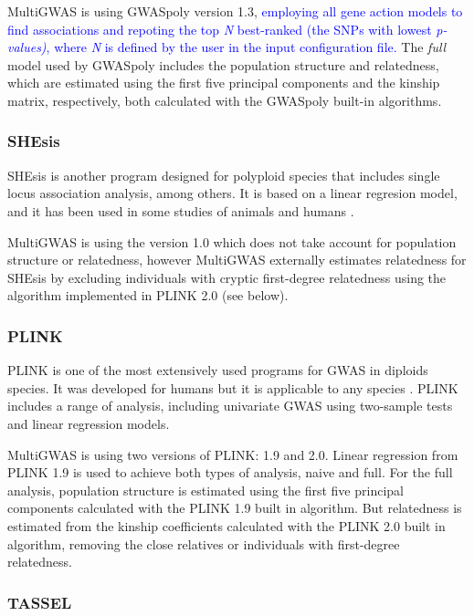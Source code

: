 \documentclass{article}
\begin{document}
MultiGWAS is using GWASpoly version 1.3, \textcolor{blue}{employing all gene action models to find associations and repoting the top }\textcolor{blue}{\emph{N }}\textcolor{blue}{best-ranked (the SNPs with lowest }\textcolor{blue}{\emph{p-values)}}\textcolor{blue}{, where }\textcolor{blue}{\emph{N}}\textcolor{blue}{{} is defined by the user in the input configuration file.} The \emph{full }model used by GWASpoly includes the population structure and relatedness, which are estimated using the first five principal components and the kinship matrix, respectively, both calculated with the GWASpoly built-in algorithms.

\subsubsection{SHEsis}

SHEsis is another program designed for polyploid species that includes single locus association analysis, among others. It is based on a linear regresion model, and it has been used in some studies of animals and humans \cite{Qiao2015,Meng2019}.

MultiGWAS is using the version 1.0 which does not take account for population structure or relatedness, however MultiGWAS externally estimates relatedness for SHEsis by excluding individuals with cryptic first-degree relatedness using the algorithm implemented in PLINK 2.0 (see below).

\subsubsection{PLINK}

PLINK is one of the most extensively used programs for GWAS in diploids species. It was developed for humans but it is applicable to any species \cite{Power2016}. PLINK includes a range of analysis, including univariate GWAS using two-sample tests and linear regression models.

MultiGWAS is using two versions of PLINK: 1.9 and 2.0. Linear regression from PLINK 1.9 is used to achieve both types of analysis, naive and full. For the full analysis, population structure is estimated using the first five principal components calculated with the PLINK 1.9 built in algorithm. But relatedness is estimated from the kinship coefficients calculated with the PLINK 2.0 built in algorithm, removing the close relatives or individuals with first-degree relatedness.

\subsubsection{TASSEL}
\end{document}

